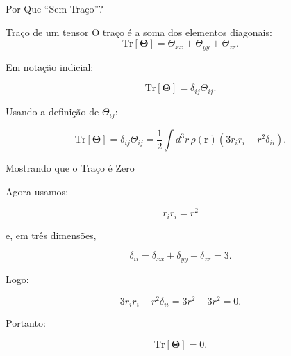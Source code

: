 \documentclass[aspectratio=169]{beamer}
\begin{document}
\begin{frame}{Por Que ``Sem Traço''?}

\begin{mybox}{Traço de um tensor}
O traço é a soma dos elementos diagonais:
\[
\mathrm{Tr}[\boldsymbol{\Theta}]
=
\Theta_{xx}+\Theta_{yy}+\Theta_{zz}.
\]
\end{mybox}

Em notação indicial:

\[
\mathrm{Tr}[\boldsymbol{\Theta}]
=
\delta_{ij}\Theta_{ij}.
\]

Usando a definição de \(\Theta_{ij}\):

\begin{eqbox}
\begin{equation}
\mathrm{Tr}[\boldsymbol{\Theta}]
=
\delta_{ij}\Theta_{ij}
=
\frac12
\int d^3r\,
\rho(\mathbf r)
\left(
3r_i r_i-r^2\delta_{ii}
\right).
\tag{4.65}
\end{equation}
\end{eqbox}

\end{frame}

\begin{frame}{Mostrando que o Traço é Zero}

Agora usamos:

\[
r_i r_i
=
r^2
\]

e, em três dimensões,

\[
\delta_{ii}
=
\delta_{xx}+\delta_{yy}+\delta_{zz}
=
3.
\]

Logo:

\[
3r_i r_i-r^2\delta_{ii}
=
3r^2-3r^2
=
0.
\]

Portanto:

\begin{eqbox}
\begin{equation}
\mathrm{Tr}[\boldsymbol{\Theta}]
=
0.
\tag{4.65}
\end{equation}
\end{eqbox}



\end{frame}
\end{document}

